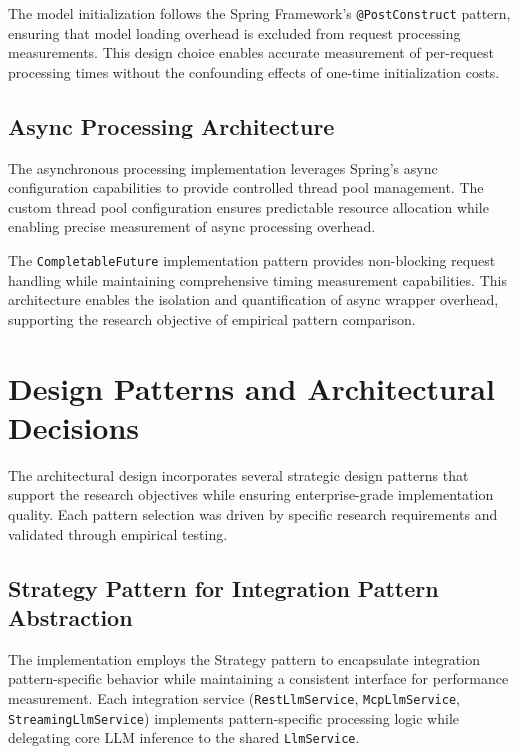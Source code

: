 The model initialization follows the Spring Framework's \texttt{@PostConstruct} pattern, ensuring that model loading overhead is excluded from request processing measurements. This design choice enables accurate measurement of per-request processing times without the confounding effects of one-time initialization costs.

\subsection{Async Processing Architecture}

The asynchronous processing implementation leverages Spring's async configuration capabilities to provide controlled thread pool management. The custom thread pool configuration ensures predictable resource allocation while enabling precise measurement of async processing overhead.

The \texttt{CompletableFuture} implementation pattern provides non-blocking request handling while maintaining comprehensive timing measurement capabilities. This architecture enables the isolation and quantification of async wrapper overhead, supporting the research objective of empirical pattern comparison.


\section{Design Patterns and Architectural Decisions}

The architectural design incorporates several strategic design patterns that support the research objectives while ensuring enterprise-grade implementation quality. Each pattern selection was driven by specific research requirements and validated through empirical testing.

\subsection{Strategy Pattern for Integration Pattern Abstraction}

The implementation employs the Strategy pattern to encapsulate integration pattern-specific behavior while maintaining a consistent interface for performance measurement. Each integration service (\texttt{RestLlmService}, \texttt{McpLlmService}, \texttt{StreamingLlmService}) implements pattern-specific processing logic while delegating core LLM inference to the shared \texttt{LlmService}.

